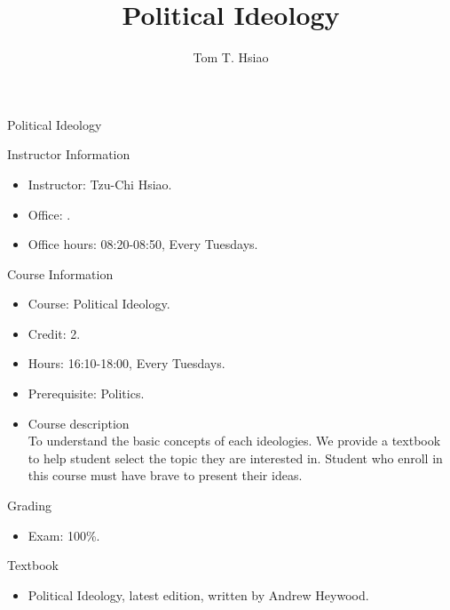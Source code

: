 \documentclass{article}
\title{Political Ideology}
\author{Tom T. Hsiao}
\date{}
\begin{document}
\begin{center}
\fontsize{16pt}{16pt}\selectfont Political Ideology \\
\end{center}
\fontsize{14pt}{14pt}\selectfont
\begin{flushleft}
Instructor Information
\end{flushleft}
\begin{itemize}
\item Instructor: Tzu-Chi Hsiao. \\
\item Office: . \\
\item Office hours: 08:20-08:50, Every Tuesdays. \\
\end{itemize}
Course Information \\
\begin{itemize}
\item Course: Political Ideology. \\
\item Credit: 2. \\
\item Hours: 16:10-18:00, Every Tuesdays. \\
\item Prerequisite: Politics. \\
\item Course description \\
To understand the basic concepts of each ideologies. We provide a textbook to help student select the topic they are interested in. Student who enroll in this course must have brave to present their ideas. \\
\end{itemize}
\begin{flushleft}
Grading \\
\end{flushleft}
\begin{itemize}
\item Exam: 100\%. \\
\end{itemize}
Textbook \\
\begin{itemize}
\item Political Ideology, latest edition, written by Andrew Heywood. \\
\end{itemize}
\end{document}
